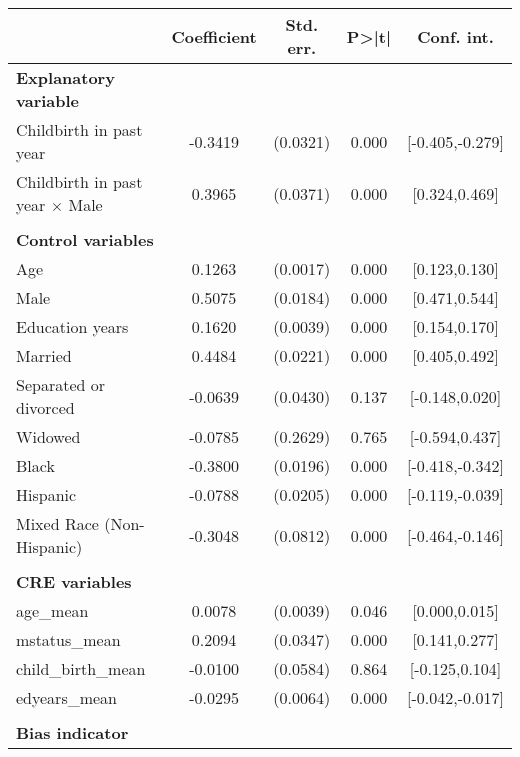 {
\def\sym#1{\ifmmode^{#1}\else\(^{#1}\)\fi}
\begin{tabular}{l*{1}{cccc}}
\toprule
                    & Coefficient&   Std. err.&       P>|t|&  Conf. int.\\
\midrule
\textbf{Explanatory variable}&            &            &            &            \\
Childbirth in past year&     -0.3419&    (0.0321)&       0.000&[-0.405,-0.279]\\
Childbirth in past year $\times$ Male&      0.3965&    (0.0371)&       0.000&[0.324,0.469]\\
\\ \textbf{Control variables}&            &            &            &            \\
Age                 &      0.1263&    (0.0017)&       0.000&[0.123,0.130]\\
Male                &      0.5075&    (0.0184)&       0.000&[0.471,0.544]\\
Education years     &      0.1620&    (0.0039)&       0.000&[0.154,0.170]\\
Married             &      0.4484&    (0.0221)&       0.000&[0.405,0.492]\\
Separated or divorced&     -0.0639&    (0.0430)&       0.137&[-0.148,0.020]\\
Widowed             &     -0.0785&    (0.2629)&       0.765&[-0.594,0.437]\\
Black               &     -0.3800&    (0.0196)&       0.000&[-0.418,-0.342]\\
Hispanic            &     -0.0788&    (0.0205)&       0.000&[-0.119,-0.039]\\
Mixed Race (Non-Hispanic)&     -0.3048&    (0.0812)&       0.000&[-0.464,-0.146]\\
\\ \textbf{CRE variables}&            &            &            &            \\
age\_mean            &      0.0078&    (0.0039)&       0.046&[0.000,0.015]\\
mstatus\_mean        &      0.2094&    (0.0347)&       0.000&[0.141,0.277]\\
child\_birth\_mean    &     -0.0100&    (0.0584)&       0.864&[-0.125,0.104]\\
edyears\_mean        &     -0.0295&    (0.0064)&       0.000&[-0.042,-0.017]\\
\\ \textbf{Bias indicator}&            &            &            &            \\

\end{tabular}}
